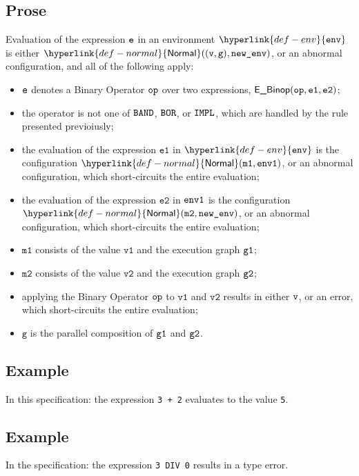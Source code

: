 \documentclass{book}
\newcommand\ProseOrAbnormal[0]{or an abnormal configuration, which short-circuits the entire evaluation}
\newcommand\Normal[0]{\hyperlink{def-normal}{\textsf{Normal}}}
\newcommand\env[0]{\hyperlink{def-env}{\texttt{env}}}
\newcommand\vg[0]{\texttt{g}}
\newcommand\vvone[0]{\texttt{v1}}
\newcommand\vvtwo[0]{\texttt{v2}}
\newcommand\vmone[0]{\texttt{m1}}
\newcommand\vmtwo[0]{\texttt{m2}}
\newcommand\veone[0]{\texttt{e1}}
\newcommand\vetwo[0]{\texttt{e2}}
\begin{document}
  \subsection{Prose}
  Evaluation of the expression $\texttt{e}$ in an environment $\env$ is either $\Normal((\vv, \vg), \newenv)$,
  or an abnormal configuration, and all of the following apply:
  \begin{itemize}
    \item $\texttt{e}$ denotes a Binary Operator $\texttt{op}$ over two expressions, $\EBinop(\op, \veone, \vetwo)$;
    \item the operator is not one of $\texttt{BAND}$, $\texttt{BOR}$, or $\texttt{IMPL}$, which are handled by the
    rule presented previoiusly;
    \item the evaluation of the expression $\veone$ in $\env$ is the configuration $\Normal(\vmone, \envone)$,
    \ProseOrAbnormal;
    \item the evaluation of the expression $\vetwo$ in $\texttt{env1}$ is the configuration \\ $\Normal(\vmtwo, \newenv)$,
    \ProseOrAbnormal;
    \item $\vmone$ consists of the value $\vvone$ and the execution graph $\texttt{g1}$;
    \item $\vmtwo$ consists of the value $\vvtwo$ and the execution graph $\texttt{g2}$;
    \item applying the Binary Operator $\texttt{op}$ to $\vvone$ and $\vvtwo$ results in either $\texttt{v}$,
    or an error, which short-circuits the entire evaluation;
    \item $\vg$ is the parallel composition of $\texttt{g1}$ and $\texttt{g2}$.
  \end{itemize}

  \subsection{Example}
    In this specification:
    the expression \texttt{3 + 2} evaluates to the value \texttt{5}.

  \subsection{Example}
    In the specification:
    the expression \texttt{3 DIV 0} results in a type error.


\end{document}

